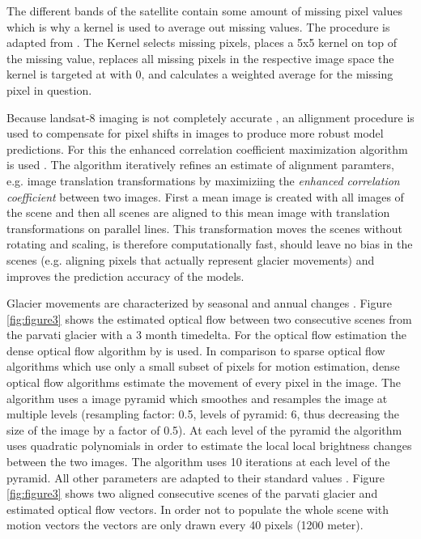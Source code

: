 \documentclass[12pt]{article}
\begin{document}
 The different bands of the satellite contain some amount of missing pixel values which is why a kernel is used to average out missing values. The procedure is adapted from \citet{vonica2021glacier}. The Kernel selects missing pixels, places a 5x5 kernel on top of the missing value, replaces all missing pixels in the respective image space the kernel is targeted at with 0, and calculates a weighted average for the missing pixel in question.
 
 Because landsat-8 imaging is not completely accurate \citep{vonica2021glacier}, an allignment procedure is used to compensate for pixel shifts in images to produce more robust model predictions. For this the enhanced correlation coefficient maximization algorithm is used \citep{evangelidis2008parametric}. The algorithm iteratively refines an estimate of alignment paramters, e.g. image translation transformations by maximiziing the \textit{enhanced correlation coefficient} between two images. First a mean image is created with all images of the scene and then all scenes are aligned to this mean image with translation transformations on parallel lines. This transformation moves the scenes without rotating and scaling, is therefore computationally fast, should leave no bias in the scenes (e.g. aligning pixels that actually represent glacier movements) and improves the prediction accuracy of the models. 
 
Glacier movements are characterized by seasonal and annual changes \citet{sam2018heterogeneity}. Figure \ref{fig:figure3} shows the estimated optical flow between two consecutive scenes from the parvati glacier with a 3 month timedelta. For the optical flow estimation the dense optical flow algorithm by \citet{farneback2003two} is used. In comparison to sparse optical flow algorithms which use only a small subset of pixels for motion estimation, dense optical flow algorithms estimate the movement of every pixel in the image. The algorithm uses a image pyramid which smoothes and resamples the image at multiple levels (resampling factor: 0.5, levels of pyramid: 6, thus decreasing the size of the image by a factor of 0.5). At each level of the pyramid the algorithm uses quadratic polynomials in order to estimate the local local brightness changes between the two images. The algorithm uses 10 iterations at each level of the pyramid. All other parameters are adapted to their standard values \citep{vonica2021glacier}. Figure \ref{fig:figure3} shows two aligned consecutive scenes of the parvati glacier and estimated optical flow vectors. In order not to populate the whole scene with motion vectors the vectors are only drawn every 40 pixels (1200 meter).
 
\end{document}
